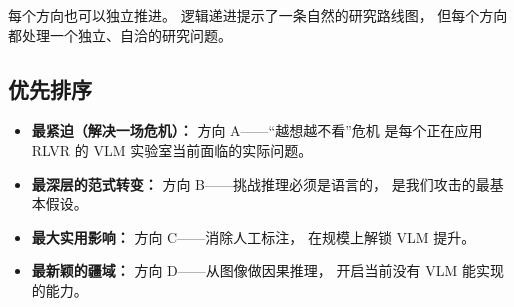 \documentclass[12pt,a4paper]{article}
\begin{document}
\noindent
每个方向也可以独立推进。
逻辑递进提示了一条自然的研究路线图，
但每个方向都处理一个独立、自洽的研究问题。

\subsection*{优先排序}

\begin{itemize}[leftmargin=2em]
  \item \textbf{最紧迫（解决一场危机）：}
    方向 A——``越想越不看''危机
    是每个正在应用 RLVR 的 VLM 实验室当前面临的实际问题。
  \item \textbf{最深层的范式转变：}
    方向 B——挑战推理必须是语言的，
    是我们攻击的最基本假设。
  \item \textbf{最大实用影响：}
    方向 C——消除人工标注，
    在规模上解锁 VLM 提升。
  \item \textbf{最新颖的疆域：}
    方向 D——从图像做因果推理，
    开启当前没有 VLM 能实现的能力。
\end{itemize}
\end{document}
